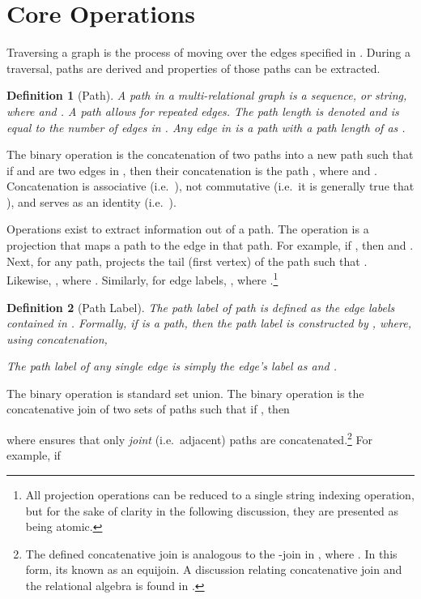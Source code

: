 \documentclass[10pt,conference,letterpaper]{IEEEtran}
\newtheorem{definition}{Definition}
\begin{document}
\section{Core Operations\label{sec:operations}}

Traversing a graph is the process of moving over the edges specified in . During a traversal, paths are derived and properties of those paths can be extracted.
\begin{definition}[Path]
A path  in a multi-relational graph is a sequence, or string, where  and . A path allows for repeated edges. The path length is denoted  and is equal to the number of edges in . Any edge in  is a path with a path length of  as .
\end{definition}

The binary operation  is the concatenation of two paths into a new path such that if  and  are two edges in , then their concatenation is the path , where  and . Concatenation is associative (i.e.~), not commutative (i.e.~it is generally true that ), and  serves as an identity (i.e.~).

Operations exist to extract information out of a path. The operation  is a projection that maps a path to the  edge in that path. For example, if , then  and . Next, for any path,  projects the tail (first vertex) of the path such that . Likewise, , where . Similarly, for edge labels, , where .\footnote{All projection operations can be reduced to a single string indexing operation, but for the sake of clarity in the following discussion, they are presented as being atomic.}
\begin{definition}[Path Label]
The \textit{path label} of path  is defined as the edge labels contained in . Formally, if  is a path, then the path label is constructed by , where, using concatenation,

The path label of any single edge  is simply the edge's label as  and .
\end{definition}

The binary operation  is standard set union. The binary operation  is the concatenative join of two sets of paths such that if , then

where  ensures that only \textit{joint} (i.e.~adjacent) paths are concatenated.\footnote{The defined concatenative join is analogous to the -join in \cite{rdbms:codd1970}, where . In this form, its known as an equijoin. A discussion relating concatenative join and the relational algebra is found in \cite{graph:pucheral1989}.} For example, if
\end{document}

